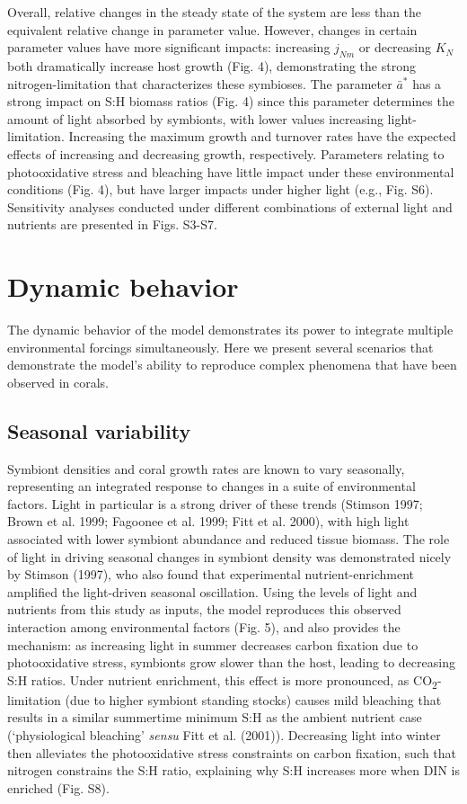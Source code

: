 \documentclass[]{elsarticle} %
\begin{document}
Overall, relative changes in the steady state of the system are less
than the equivalent relative change in parameter value. However, changes
in certain parameter values have more significant impacts: increasing
\(j_{Nm}\) or decreasing \(K_N\) both dramatically increase host growth
(Fig. 4), demonstrating the strong nitrogen-limitation that
characterizes these symbioses. The parameter \(\bar{a}^*\) has a strong
impact on S:H biomass ratios (Fig. 4) since this parameter determines
the amount of light absorbed by symbionts, with lower values increasing
light-limitation. Increasing the maximum growth and turnover rates have
the expected effects of increasing and decreasing growth, respectively.
Parameters relating to photooxidative stress and bleaching have little
impact under these environmental conditions (Fig. 4), but have larger
impacts under higher light (e.g., Fig. S6). Sensitivity analyses
conducted under different combinations of external light and nutrients
are presented in Figs. S3-S7.

\section{Dynamic behavior}\label{dynamic-behavior}

The dynamic behavior of the model demonstrates its power to integrate
multiple environmental forcings simultaneously. Here we present several
scenarios that demonstrate the model's ability to reproduce complex
phenomena that have been observed in corals.

\subsection{Seasonal variability}\label{seasonal-variability}

Symbiont densities and coral growth rates are known to vary seasonally,
representing an integrated response to changes in a suite of
environmental factors. Light in particular is a strong driver of these
trends (Stimson 1997; Brown et al. 1999; Fagoonee et al. 1999; Fitt et
al. 2000), with high light associated with lower symbiont abundance and
reduced tissue biomass. The role of light in driving seasonal changes in
symbiont density was demonstrated nicely by Stimson (1997), who also
found that experimental nutrient-enrichment amplified the light-driven
seasonal oscillation. Using the levels of light and nutrients from this
study as inputs, the model reproduces this observed interaction among
environmental factors (Fig. 5), and also provides the mechanism: as
increasing light in summer decreases carbon fixation due to
photooxidative stress, symbionts grow slower than the host, leading to
decreasing S:H ratios. Under nutrient enrichment, this effect is more
pronounced, as CO\textsubscript{2}-limitation (due to higher symbiont
standing stocks) causes mild bleaching that results in a similar
summertime minimum S:H as the ambient nutrient case (`physiological
bleaching' \emph{sensu} Fitt et al. (2001)). Decreasing light into
winter then alleviates the photooxidative stress constraints on carbon
fixation, such that nitrogen constrains the S:H ratio, explaining why
S:H increases more when DIN is enriched (Fig. S8).
\end{document}
